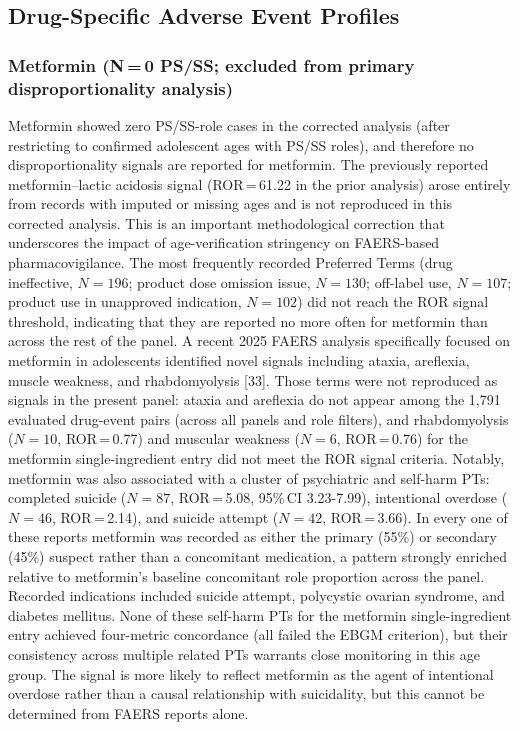 \documentclass[10pt,a4paper]{article}
\begin{document}
\subsection{Drug-Specific Adverse Event Profiles}

\subsubsection{Metformin (N\,=\,0 PS/SS; excluded from primary disproportionality analysis)}
Metformin showed zero PS/SS-role cases in the corrected analysis (after restricting to confirmed adolescent ages with PS/SS roles), and therefore no disproportionality signals are reported for metformin. The previously reported metformin--lactic acidosis signal (ROR\,=\,61.22 in the prior analysis) arose entirely from records with imputed or missing ages and is not reproduced in this corrected analysis. This is an important methodological correction that underscores the impact of age-verification stringency on FAERS-based pharmacovigilance. The most frequently recorded Preferred Terms 
(drug ineffective, $N=196$; product dose omission issue, $N=130$; off-label use, $N=107$; product use in 
unapproved indication, $N=102$) did not reach the ROR signal threshold, indicating that they are reported 
no more often for metformin than across the rest of the panel. A recent 2025 FAERS analysis specifically focused on metformin in adolescents identified novel signals including ataxia, areflexia, muscle weakness, and rhabdomyolysis [33]. Those terms were not reproduced as signals in the present panel: ataxia and areflexia do not appear among the 1{,}791 evaluated drug-event pairs (across all panels and role filters), and rhabdomyolysis ($N=10$, ROR\,=\,0.77) and muscular weakness ($N=6$, ROR\,=\,0.76) for the metformin single-ingredient entry did not meet the ROR signal criteria. Notably, metformin was also associated with a cluster of psychiatric and self-harm PTs: completed suicide ($N=87$, ROR\,=\,5.08, 95\%\,CI 3.23-7.99), intentional overdose ($N=46$, ROR\,=\,2.14), and suicide attempt ($N=42$, ROR\,=\,3.66). In every one of these reports metformin was recorded as either the primary (55\%) or secondary (45\%) suspect rather than a concomitant medication, a pattern strongly enriched relative to metformin's baseline concomitant role proportion across the panel. Recorded indications included suicide attempt, polycystic ovarian 
syndrome, and diabetes mellitus. None of these self-harm PTs for the metformin single-ingredient entry achieved four-metric concordance (all failed 
the EBGM criterion), but their consistency across multiple related PTs warrants close monitoring in this 
age group. The signal is more likely to reflect metformin as the agent of intentional overdose rather than a causal relationship with suicidality, but this cannot be determined from FAERS reports alone.
\end{document}

